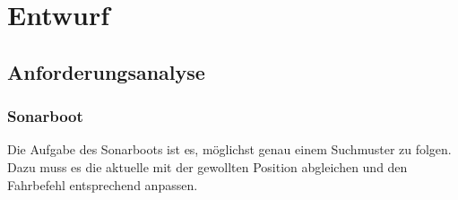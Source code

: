 
\chapter{Entwurf}
\label{ch:entwurf}

\section{Anforderungsanalyse}

\subsection{Sonarboot}

Die Aufgabe des Sonarboots ist es, möglichst genau einem Suchmuster zu folgen. Dazu muss es die aktuelle mit der gewollten Position abgleichen und den Fahrbefehl entsprechend anpassen.

